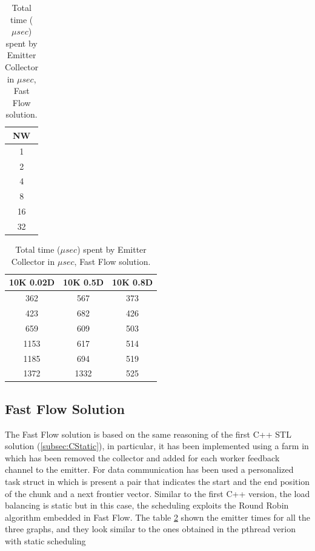 \begin{table}[!htb]
    \centering
    \begin{minipage}{0.08\textwidth}
    \centering
    \begin{tabular}{|c|}
    \hline
    NW \\ \hline
    1          \\ \hline
    2      \\ \hline
    4           \\ \hline
    8            \\ \hline
    16       \\ \hline
    32          \\ \hline
    \end{tabular}
    \end{minipage} 
\begin{minipage}{0.43\textwidth}
\centering
\begin{tabular}{|c|c|c|}
    \hline
    10K 0.02D & 10K 0.5D & 10K 0.8D \\ \hline
    362       & 567      & 373      \\ \hline
    423       & 682      & 426      \\ \hline
    659       & 609      & 503      \\ \hline
    1153      & 617      & 514      \\ \hline
    1185      & 694      & 519      \\ \hline
    1372      & 1332     & 525      \\ \hline
\end{tabular}
\end{minipage}
\caption{Total time ($\mu sec$) spent by Emitter Collector in $\mu sec$, Fast Flow solution.}
\label{table:emit_coll_ff}
\end{table}
\FloatBarrier

\subsection{Fast Flow Solution}
The Fast Flow solution is based on the same reasoning of the first C++ STL solution (\ref{subsec:CStatic}), in particular, it has been implemented using a farm in which has been removed the collector and added for each worker feedback channel to the emitter. For data communication has been used a personalized task struct in which is present a pair that indicates the start and the end position of the chunk and a next frontier vector. Similar to the first C++ version,  the load balancing is static but in this case, the scheduling exploits the Round Robin algorithm embedded in Fast Flow. The table \ref{table:emit_coll_ff} shown the emitter times for all the three graphs, and they look similar to the ones obtained in the pthread verion with static scheduling 

